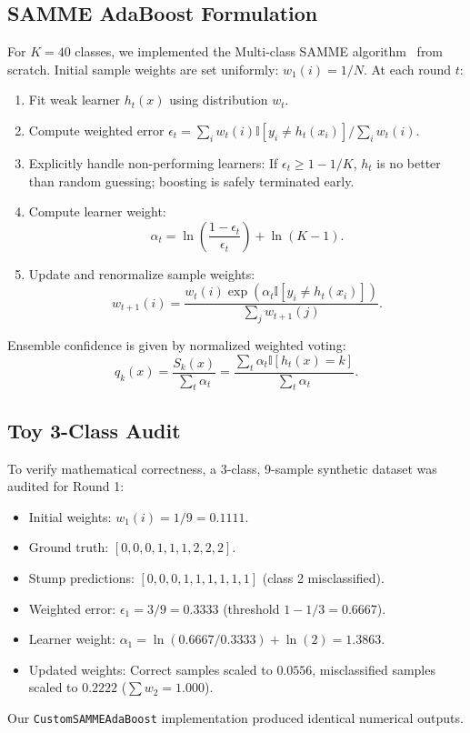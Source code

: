 \documentclass[10pt,twocolumn,letterpaper]{article}
\begin{document}
\subsection{SAMME AdaBoost Formulation}
For $K = 40$ classes, we implemented the Multi-class SAMME algorithm~\cite{hastie2009samme} from scratch. Initial sample weights are set uniformly: $w_1(i) = 1/N$. At each round $t$:
\begin{enumerate}[leftmargin=*]
    \item Fit weak learner $h_t(x)$ using distribution $w_t$.
    \item Compute weighted error $\epsilon_t = \sum_{i} w_t(i) \mathbb{I}[y_i \neq h_t(x_i)] / \sum_i w_t(i)$.
    \item Explicitly handle non-performing learners: If $\epsilon_t \ge 1 - 1/K$, $h_t$ is no better than random guessing; boosting is safely terminated early.
    \item Compute learner weight:
    \begin{equation}
        \alpha_t = \ln\left(\frac{1 - \epsilon_t}{\epsilon_t}\right) + \ln(K - 1).
    \end{equation}
    \item Update and renormalize sample weights:
    \begin{equation}
        w_{t+1}(i) = \frac{w_t(i) \exp(\alpha_t \mathbb{I}[y_i \neq h_t(x_i)])}{\sum_{j} w_{t+1}(j)}.
    \end{equation}
\end{enumerate}
Ensemble confidence is given by normalized weighted voting:
\begin{equation}
    q_k(x) = \frac{S_k(x)}{\sum_t \alpha_t} = \frac{\sum_t \alpha_t \mathbb{I}[h_t(x) = k]}{\sum_t \alpha_t}.
\end{equation}

\subsection{Toy 3-Class Audit}
To verify mathematical correctness, a 3-class, 9-sample synthetic dataset was audited for Round 1:
\begin{itemize}[leftmargin=*]
    \item Initial weights: $w_1(i) = 1/9 = 0.1111$.
    \item Ground truth: $[0,0,0, 1,1,1, 2,2,2]$.
    \item Stump predictions: $[0,0,0, 1,1,1, 1,1,1]$ (class 2 misclassified).
    \item Weighted error: $\epsilon_1 = 3/9 = 0.3333$ (threshold $1 - 1/3 = 0.6667$).
    \item Learner weight: $\alpha_1 = \ln(0.6667 / 0.3333) + \ln(2) = 1.3863$.
    \item Updated weights: Correct samples scaled to $0.0556$, misclassified samples scaled to $0.2222$ ($\sum w_2 = 1.000$).
\end{itemize}
Our \texttt{CustomSAMMEAdaBoost} implementation produced identical numerical outputs.
\end{document}
